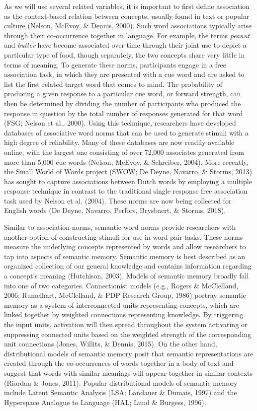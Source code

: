 \documentclass[english,man]{apa6}
\theoremstyle{definition}
\theoremstyle{definition}
\theoremstyle{definition}
\theoremstyle{remark}
\begin{document}
As we will use several related variables, it is important to first
define association as the context-based relation between concepts,
usually found in text or popular culture (Nelson, McEvoy, \& Dennis,
2000). Such word associations typically arise through their
co-occurrence together in language. For example, the terms \emph{peanut}
and \emph{butter} have become associated over time through their joint
use to depict a particular type of food, though separately, the two
concepts share very little in terms of meaning. To generate these norms,
participants engage in a free association task, in which they are
presented with a cue word and are asked to list the first related target
word that comes to mind. The probability of producing a given response
to a particular cue word, or forward strength, can then be determined by
dividing the number of participants who produced the response in
question by the total number of responses generated for that word (FSG;
Nelson et al., 2000). Using this technique, researchers have developed
databases of associative word norms that can be used to generate stimuli
with a high degree of reliability. Many of these databases are now
readily available online, with the largest one consisting of over 72,000
associates generated from more than 5,000 cue words (Nelson, McEvoy, \&
Schreiber, 2004). More recently, the Small World of Words project (SWOW;
De Deyne, Navarro, \& Storms, 2013) has sought to capture associations
between Dutch words by employing a multiple response technique in
contrast to the traditional single response free association task used
by Nelson et al. (2004). These norms are now being collected for English
words (De Deyne, Navarro, Perfors, Brysbaert, \& Storms, 2018).

Similar to association norms, semantic word norms provide researchers
with another option of constructing stimuli for use in word-pair tasks.
These norms measure the underlying concepts represented by words and
allow researchers to tap into aspects of semantic memory. Semantic
memory is best described as an organized collection of our general
knowledge and contains information regarding a concept's meaning
(Hutchison, 2003). Models of semantic memory broadly fall into one of
two categories. Connectionist models (e.g., Rogers \& McClelland, 2006;
Rumelhart, McClelland, \& PDP Research Group, 1986) portray semantic
memory as a system of interconnected units representing concepts, which
are linked together by weighted connections representing knowledge. By
triggering the input units, activation will then spread throughout the
system activating or suppressing connected units based on the weighted
strength of the corresponding unit connections (Jones, Willits, \&
Dennis, 2015). On the other hand, distributional models of semantic
memory posit that semantic representations are created through the
co-occurrences of words together in a body of text and suggest that
words with similar meanings will appear together in similar contexts
(Riordan \& Jones, 2011). Popular distributional models of semantic
memory include Latent Semantic Analysis (LSA; Landauer \& Dumais, 1997)
and the Hyperspace Analogue to Language (HAL; Lund \& Burgess, 1996).
\end{document}
